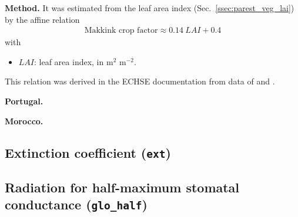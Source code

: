 \documentclass{scrreprt}
\newenvironment{denseitem}{
  \begin{itemize}
    \setlength{\itemsep}{0pt}
    \setlength{\parskip}{0pt}
    \setlength{\parsep}{0pt}
}{
  \end{itemize}
}
\begin{document}
\textbf{Method.}
It was estimated from the leaf area index (Sec.~\ref{ssec:parest_veg_lai}) by the affine relation
\begin{align} \label{eq:cropmakk}
  \text{Makkink~crop~factor} \approx 0.14 ~ LAI + 0.4
\end{align}
%
with
\begin{denseitem}
  \item[] $LAI$: leaf area index, in m$^2$ m$^{-2}$.
\end{denseitem}
%
This relation was derived in the ECHSE documentation from data of \citet{feddes87} and \citet{ludwig06}.

\textbf{Portugal.}

\textbf{Morocco.}

\subsection{Extinction coefficient (\texttt{ext})} \label{ssec:parest_veg_ext}

\subsection{Radiation for half-maximum stomatal conductance (\texttt{glo\_half})} \label{ssec:parest_veg_glohalf}
\end{document}
